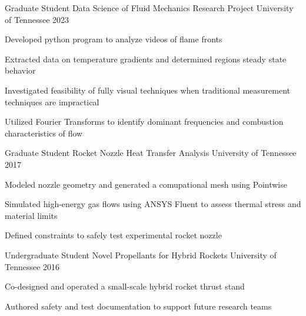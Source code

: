 
\begin{cventries}
  \cventry
    {Graduate Student}
    {Data Science of Fluid Mechanics Research Project} %
    {University of Tennessee} %
    {2023} %
    {
      \begin{cvitems} %
        \item {Developed python program to analyze videos of flame fronts}
        \item {Extracted data on temperature gradients and determined regions steady state behavior}
        \item {Investigated feasibility of fully visual techniques when traditional measurement techniques are impractical}
        \item {Utilized Fourier Transforms to identify dominant frequencies and combustion characteristics of flow}
      \end{cvitems}
    }

  \cventry
    {Graduate Student}
    {Rocket Nozzle Heat Transfer Analysis} %
    {University of Tennessee} %
    {2017} %
    {
      \begin{cvitems} %
        \item {Modeled nozzle geometry and generated a comupational mesh using Pointwise}
        \item {Simulated high-energy gas flows using ANSYS Fluent to assess thermal stress and material limits}
        \item {Defined constraints to safely test experimental rocket nozzle}
      \end{cvitems}
    }

  \cventry
    {Undergraduate Student}
    {Novel Propellants for Hybrid Rockets} %
    {University of Tennessee} %
    {2016} %
    {
      \begin{cvitems} %
        \item {Co-designed and operated a small-scale hybrid rocket thrust stand}
		    \item {Authored safety and test documentation to support future research teams}
      \end{cvitems}
    }

\end{cventries}